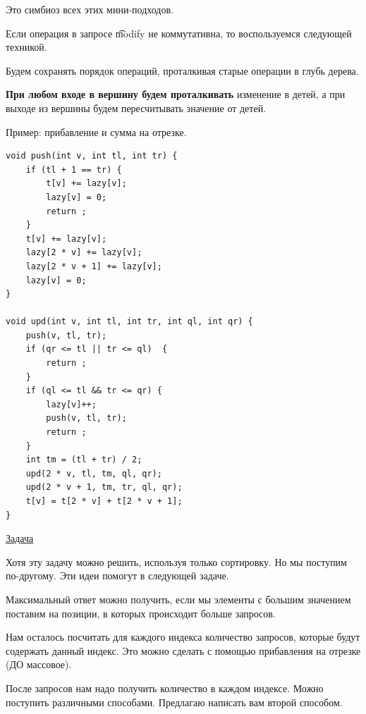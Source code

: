 \pagebreak


Это симбиоз всех этих мини-подходов.

Если операция в запросе \t{modify} не коммутативна, то воспользуемся следующей техникой.

Будем сохранять порядок операций, проталкивая старые операции в глубь дерева.

{\bf При любом входе в вершину будем проталкивать} изменение в детей, а при выходе из вершины будем пересчитывать значение от детей.

Пример: прибавление и сумма на отрезке.

\up \up
\begin{verbatim}
void push(int v, int tl, int tr) {
    if (tl + 1 == tr) {
        t[v] += lazy[v];
        lazy[v] = 0;
        return ;
    }
    t[v] += lazy[v];
    lazy[2 * v] += lazy[v];
    lazy[2 * v + 1] += lazy[v];
    lazy[v] = 0;
}

void upd(int v, int tl, int tr, int ql, int qr) {
    push(v, tl, tr);
    if (qr <= tl || tr <= ql)  {
        return ;
    }
    if (ql <= tl && tr <= qr) {
        lazy[v]++;
        push(v, tl, tr);
        return ;
    }
    int tm = (tl + tr) / 2;
    upd(2 * v, tl, tm, ql, qr);
    upd(2 * v + 1, tm, tr, ql, qr);
    t[v] = t[2 * v] + t[2 * v + 1];
}
\end{verbatim}

\pagebreak


\href{https://codeforces.com/contest/276/problem/C}{Задача}
\href{https://codeforces.com/contest/276/submission/106207096}{}

Хотя эту задачу можно решить, используя только сортировку. Но мы поступим по-другому. Эти идеи помогут в следующей задаче.

Максимальный ответ можно получить, если мы элементы с большим значением поставим на позиции, в которых происходит больше запросов.

Нам осталось посчитать для каждого индекса количество запросов, которые будут содержать данный индекс. Это можно сделать с помощью прибавления на отрезке (ДО массовое).

После запросов нам надо получить количество в каждом индексе. Можно поступить различными способами. Предлагаю написать вам второй способом.
\down


